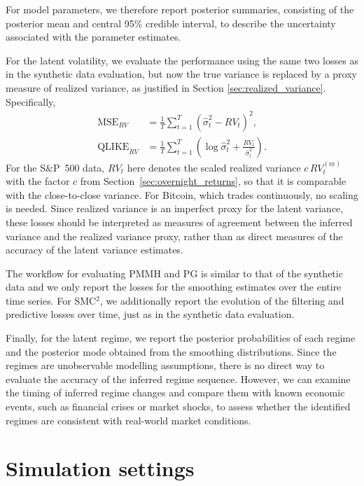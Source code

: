 For model parameters, we therefore report posterior summaries, consisting of the posterior mean and central 95\% credible interval, to describe the uncertainty associated with the parameter estimates.

For the latent volatility, we evaluate the performance using the same two losses as in the synthetic data evaluation, but now the true variance is replaced by a proxy measure of realized variance, as justified in Section \ref{sec:realized_variance}. Specifically,
\begin{align*}
    \operatorname{MSE}_{RV} &=
    \frac{1}{T}\sum_{t=1}^T
    \left(\hat{\sigma}_{t}^2-RV_t\right)^2, \\
    \operatorname{QLIKE}_{RV} &=
    \frac{1}{T}\sum_{t=1}^T
    \left(
    \log\hat{\sigma}_{t}^2+
    \frac{RV_t}{\hat{\sigma}_{t}^2}
    \right).
\end{align*}
For the S\&P~500 data, $RV_t$ here denotes the scaled realized variance $c\,RV_t^{(m)}$ with the factor $c$ from Section~\ref{sec:overnight_returns}, so that it is comparable with the close-to-close variance. For Bitcoin, which trades continuously, no scaling is needed. Since realized variance is an imperfect proxy for the latent variance, these losses should be interpreted as measures of agreement between the inferred variance and the realized variance proxy, rather than as direct measures of the accuracy of the latent variance estimates.

The workflow for evaluating PMMH and PG is similar to that of the synthetic data and we only report the losses for the smoothing estimates over the entire time series. For SMC$^2$, we additionally report the evolution of the filtering and predictive losses over time, just as in the synthetic data evaluation. 

Finally, for the latent regime, we report the posterior probabilities of each regime and the posterior mode obtained from the smoothing distributions. Since the regimes are unobservable modelling assumptions, there is no direct way to evaluate the accuracy of the inferred regime sequence. However, we can examine the timing of inferred regime changes and compare them with known economic events, such as financial crises or market shocks, to assess whether the identified regimes are consistent with real-world market conditions.


\section{Simulation settings}
\label{sec:simulation_settings}

